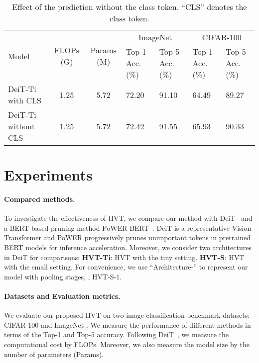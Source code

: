 \begin{table*}[]
\renewcommand\arraystretch{1.2}
\centering
\caption{Effect of the prediction without the class token. ``CLS'' denotes the class token. 
}
\vspace{-5pt}
\resizebox{0.9\textwidth}{!} {
\fontsize{13}{13}\selectfont
\begin{tabular}{lcc|ll|ll}
\multirow{2}{*}{Model} & \multirow{2}{*}{FLOPs (G)} & \multirow{2}{*}{Params (M)} & \multicolumn{2}{c}{ImageNet} & \multicolumn{2}{c}{CIFAR-100} \\ \cline{4-7} 
 &  &  & Top-1 Acc. (\%)  & Top-5 Acc. (\%) & Top-1 Acc. (\%)  & Top-5 Acc. (\%) \\ \shline
DeiT-Ti with CLS & 1.25 & 5.72 & 72.20 & 91.10 & 64.49 & 89.27 \\
DeiT-Ti without CLS & 1.25 & 5.72 & 72.42{\color[HTML]{009901} \fontsize{9pt}{9pt}\selectfont{ (+0.22)}} & 91.55{\color[HTML]{009901} \fontsize{9pt}{9pt}\selectfont{ (+0.45)}} & 65.93{\color[HTML]{009901} \fontsize{9pt}{9pt}\selectfont{ (+1.44)}} & 90.33{\color[HTML]{009901} \fontsize{9pt}{9pt}\selectfont{ (+1.06)}} \\
\end{tabular}
}
\label{tab:cls_token}
\vspace{-5pt}
\end{table*}

\section{Experiments} \label{experiment}

\paragraph{Compared methods.} To investigate the effectiveness of HVT, we 
compare our method with DeiT~\cite{deit} and a BERT-based pruning method PoWER-BERT~\cite{powerbert}. DeiT is a representative Vision Transformer and PoWER progressively prunes unimportant tokens in pretrained BERT models for inference acceleration. Moreover, we 
consider two architectures in DeiT for comparisons: \textbf{HVT-Ti}: HVT with the tiny setting. \textbf{HVT-S}: HVT with the small setting. For convenience, we use “Architecture-” to represent our model with  pooling stages, \eg, HVT-S-1.


\paragraph{Datasets and Evaluation metrics.} We evaluate our proposed HVT on two image classification benchmark datasets: CIFAR-100 \cite{krizhevsky2009learning} and ImageNet \cite{russakovsky2015imagenet}. We measure the performance of different methods in terms of the Top-1 and Top-5 accuracy. Following DeiT~\cite{deit}, we measure the computational cost by FLOPs. Moreover, we also measure the model size by the number of parameters (Params).

